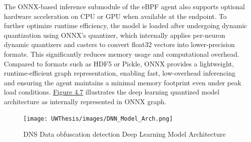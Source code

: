 \documentclass [11pt, proquest] {uwthesis}[2020/02/24]
\begin{document}
The ONNX-based inference submodule of the eBPF agent also supports optional hardware acceleration on CPU or GPU when available at the endpoint. To further optimize runtime efficiency, the model is loaded after undergoing dynamic quantization using ONNX’s quantizer, which internally applies per-neuron dynamic quantizers and casters to convert float32 vectors into lower-precision formats. This significantly reduces memory usage and computational overhead. Compared to formats such as HDF5 or Pickle, ONNX provides a lightweight, runtime-efficient graph representation, enabling fast, low-overhead inferencing and ensuring the agent maintains a minimal memory footprint even under peak load conditions. \hyperref[sec:model_arch]{Figure 4.7} illustrates the deep learning quantized model architecture as internally represented in ONNX graph. 




\begin{figure}[H]
\texttt{[image: UWThesis/images/DNN\_Model\_Arch.png]}
\caption{DNS Data obfuscation detection Deep Learning Model Architecture}
\label{sec:model_arch}
\end{figure}
\end{document}
